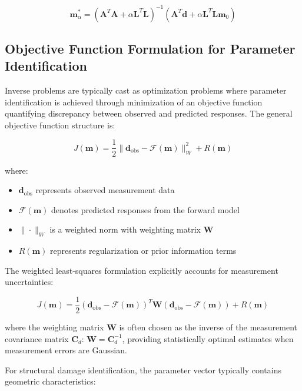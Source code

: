 \documentclass[12pt,a4paper]{report}
\begin{document}
\begin{equation}
\mathbf{m}_{\alpha}^* = (\mathbf{A}^T\mathbf{A} + \alpha \mathbf{L}^T\mathbf{L})^{-1}(\mathbf{A}^T\mathbf{d} + \alpha \mathbf{L}^T\mathbf{L}\mathbf{m}_0)
\end{equation}

\subsection{Objective Function Formulation for Parameter Identification}

Inverse problems are typically cast as optimization problems where parameter identification is achieved through minimization of an objective function quantifying discrepancy between observed and predicted responses. The general objective function structure is:

\begin{equation}
J(\mathbf{m}) = \frac{1}{2}\|\mathbf{d}_{\text{obs}} - \mathcal{F}(\mathbf{m})\|_W^2 + R(\mathbf{m})
\end{equation}

where:
\begin{itemize}
\item $\mathbf{d}_{\text{obs}}$ represents observed measurement data
\item $\mathcal{F}(\mathbf{m})$ denotes predicted responses from the forward model
\item $\|\cdot\|_W$ is a weighted norm with weighting matrix $\mathbf{W}$
\item $R(\mathbf{m})$ represents regularization or prior information terms
\end{itemize}

The weighted least-squares formulation explicitly accounts for measurement uncertainties:

\begin{equation}
J(\mathbf{m}) = \frac{1}{2}(\mathbf{d}_{\text{obs}} - \mathcal{F}(\mathbf{m}))^T \mathbf{W} (\mathbf{d}_{\text{obs}} - \mathcal{F}(\mathbf{m})) + R(\mathbf{m})
\end{equation}

where the weighting matrix $\mathbf{W}$ is often chosen as the inverse of the measurement covariance matrix $\mathbf{C}_d$: $\mathbf{W} = \mathbf{C}_d^{-1}$, providing statistically optimal estimates when measurement errors are Gaussian.

For structural damage identification, the parameter vector typically contains geometric characteristics:
\end{document}
